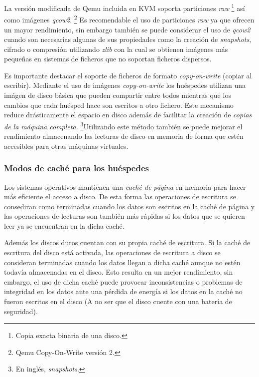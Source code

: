 \documentclass[spanisheDIVcalc,twoside,parskip-,pointlessnumbers,final]{scrbook}
\begin{document}
La versión modificada de Qemu incluida en KVM soporta particiones
\emph{raw}%
\footnote{Copia exacta binaria de una disco.%
}\emph{ }así como imágenes \emph{qcow2}.%
\footnote{Qemu Copy-On-Write versión 2.%
} Es recomendable el uso de particiones \emph{raw }ya que ofrecen un
mayor rendimiento, sin embargo también se puede considerar el uso
de \emph{qcow2 }cuando son necesarias algunas de sus propiedades como
la creación de \emph{snapshots}, cifrado o compresión utilizando \emph{zlib} con la cual se
obtienen imágenes más pequeñas en sistemas de ficheros que no soportan
ficheros dispersos.

Es importante destacar el soporte de ficheros de formato \emph{copy-on-write}
(copiar al escribir). Mediante el uso de imágenes \emph{copy-on-write}
los huéspedes utilizan una imágen de disco básica que pueden compartir
entre todos mientras que los cambios que cada huésped hace son escritos
a otro fichero. Este mecanismo reduce drásticamente el espacio en
disco además de facilitar la creación de \emph{copias de la máquina
completa.}%
\footnote{En inglés, \emph{snapshots}.%
}Utilizando este método también se puede mejorar el rendimiento almacenando
las lecturas de disco en memoria de forma que estén accesibles para
otras máquinas virtuales.


\subsubsection*{Modos de caché para los huéspedes}

Los sistemas operativos mantienen una \emph{caché de página} en memoria
para hacer más eficiente el acceso a disco. De esta forma las operaciones
de escritura se consediran como terminadas cuando los datos son escritos
en la caché de página y las operaciones de lecturas son también más
rápidas si los datos que se quieren leer ya se encuentran en la dicha
caché. 

Además los discos duros cuentan con su propia caché de escritura.
Si la caché de escritura del disco está activada, las operaciones
de escritura a disco se consideran terminadas cuando los datos llegan
a dicha caché aunque no estén todavía almacenadas en el disco. Esto
resulta en un mejor rendimiento, sin embargo, el uso de dicha caché
puede provocar inconsistencias o problemas de integridad en los datos
ante una pérdida de energía si los datos en la caché no fueron escritos
en el disco (A no ser que el disco cuente con una batería de seguridad).
\end{document}
